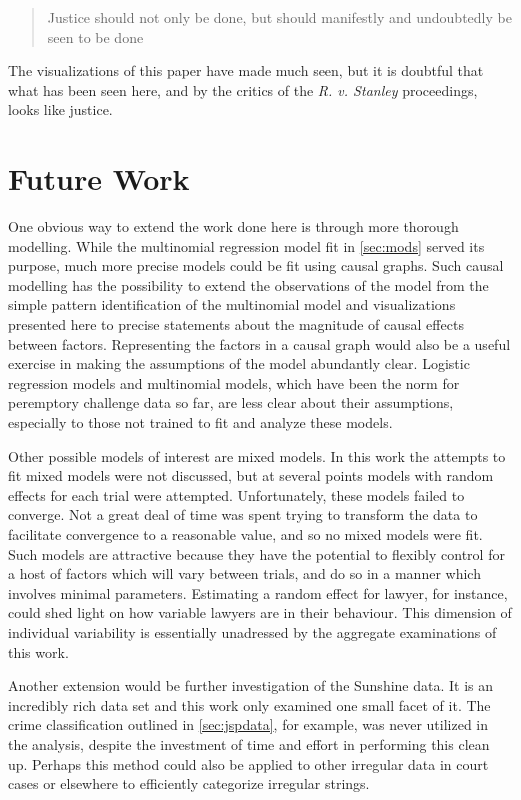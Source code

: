 \begin{quote}
  Justice should not only be done, but should manifestly and undoubtedly be seen to be done
\end{quote}

The visualizations of this paper have made much seen, but it is doubtful that what has been seen here, and by the critics of the
\textit{R. v. Stanley} proceedings, looks like justice.

\section{Future Work}
\label{sec:FutureWork}

One obvious way to extend the work done here is through more thorough modelling. While the multinomial regression model fit in
\ref{sec:mods} served its purpose, much more precise models could be fit using causal graphs. Such causal modelling has the
possibility to extend the observations of the model from the simple pattern identification of the multinomial model and
visualizations presented here to precise statements about the magnitude of causal effects between factors. Representing the
factors in a causal graph would also be a useful exercise in making the assumptions of the model abundantly clear. Logistic
regression models and multinomial models, which have been the norm for peremptory challenge data so far, are less clear about
their assumptions, especially to those not trained to fit and analyze these models.

Other possible models of interest are mixed models. In this work the attempts to fit mixed models were not discussed, but at
several points models with random effects for each trial were attempted. Unfortunately, these models failed to converge. Not a
great deal of time was spent trying to transform the data to facilitate convergence to a reasonable value, and so no mixed models
were fit. Such models are attractive because they have the potential to flexibly control for a host of factors which will vary
between trials, and do so in a manner which involves minimal parameters. Estimating a random effect for lawyer,
for instance, could shed light on how variable lawyers are in their behaviour. This dimension of individual variability is
essentially unadressed by the aggregate examinations of this work.

Another extension would be further investigation of the Sunshine data. It is an incredibly rich data set and this work only
examined one small facet of it. The crime classification outlined in \ref{sec:jspdata}, for example, was never utilized in the
analysis, despite the investment of time and effort in performing this clean up. Perhaps this method could also be
applied to other irregular data in court cases or elsewhere to efficiently categorize irregular strings.

